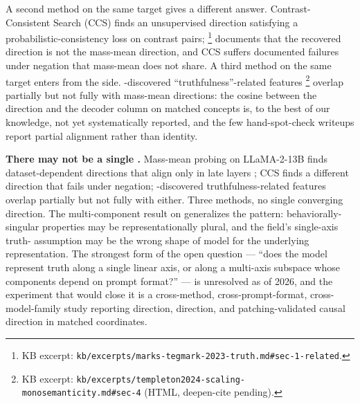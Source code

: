 A second method on the same target gives a different answer.
Contrast-Consistent Search (CCS)
 finds an
unsupervised direction satisfying a probabilistic-consistency loss
on contrast pairs; \citet[\S 1 related work]{marks-tegmark-2023-truth}\footnote{KB
excerpt: \nolinkurl{kb/excerpts/marks-tegmark-2023-truth.md#sec-1-related}.}
documents that the recovered direction is not the mass-mean
direction, and CCS suffers documented failures under negation that
mass-mean does not share. A third method on the same target enters from the  side.
-discovered ``truthfulness''-related features
\citep[\S 4]{templeton2024-scaling-monosemanticity}\footnote{KB
excerpt: \nolinkurl{kb/excerpts/templeton2024-scaling-monosemanticity.md#sec-4}
(HTML, deepen-cite pending).} 
overlap partially but not fully with mass-mean directions: the
cosine between the  direction and the   decoder
column on matched concepts is, to the best of our knowledge, not
yet systematically reported, and the few hand-spot-check writeups
report partial alignment rather than identity.

\begin{contradiction}
\textbf{There may not be a single .} Mass-mean
probing on LLaMA-2-13B finds dataset-dependent directions that align
only in late layers \citep[\S 4]{marks-tegmark-2023-truth}; CCS
finds a different direction that fails under negation; -discovered
truthfulness-related features overlap partially but not fully with
either. Three methods, no single converging direction. The
\citet{vennemeyer2025-sycophancy-not-one-thing} multi-component
result on  generalizes the pattern: behaviorally-singular
properties may be representationally plural, and the field's
single-axis truth- assumption may be the wrong shape of model
for the underlying representation. The strongest form of the open
question --- ``does the model represent truth along a single linear
axis, or along a multi-axis subspace whose components depend on
prompt format?'' --- is unresolved as of 2026, and the experiment
that would close it is a cross-method, cross-prompt-format,
cross-model-family study reporting  direction,  
direction, and patching-validated causal direction in matched
coordinates.
\end{contradiction}

